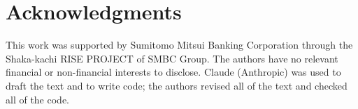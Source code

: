 \section{Acknowledgments}
\label{sec:acknowledgments}

This work was supported by Sumitomo Mitsui Banking Corporation through the
Shaka-kachi RISE PROJECT of SMBC Group. The authors have no relevant financial
or non-financial interests to disclose. Claude (Anthropic) was used to draft
the text and to write code; the authors revised all of the text and checked
all of the code.
